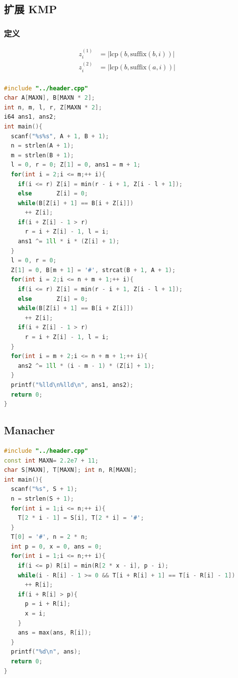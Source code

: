 \documentclass[10pt]{ctexart}
\begin{document}
\begin{multicols}{3}
    \subsection{扩展 KMP}\label{ux6269ux5c55-kmp}

    \subsubsection{定义}\label{ux5b9aux4e49}

    \[
    \begin{aligned}
    z^{(1)}_i &= |\mathrm{lcp}(b, \mathrm{suffix}(b, i))| \\
    z^{(2)}_i &= |\mathrm{lcp}(b, \mathrm{suffix}(a, i))| \\
    \end{aligned}
    \]

\begin{lstlisting}[language={C++}]
#include "../header.cpp"
char A[MAXN], B[MAXN * 2];
int n, m, l, r, Z[MAXN * 2];
i64 ans1, ans2;
int main(){
  scanf("%s%s", A + 1, B + 1);
  n = strlen(A + 1);
  m = strlen(B + 1);
  l = 0, r = 0; Z[1] = 0, ans1 = m + 1;
  for(int i = 2;i <= m;++ i){
    if(i <= r) Z[i] = min(r - i + 1, Z[i - l + 1]);
    else       Z[i] = 0;
    while(B[Z[i] + 1] == B[i + Z[i]])
      ++ Z[i];
    if(i + Z[i] - 1 > r)
      r = i + Z[i] - 1, l = i;
    ans1 ^= 1ll * i * (Z[i] + 1);
  }
  l = 0, r = 0;
  Z[1] = 0, B[m + 1] = '#', strcat(B + 1, A + 1);
  for(int i = 2;i <= n + m + 1;++ i){
    if(i <= r) Z[i] = min(r - i + 1, Z[i - l + 1]);
    else       Z[i] = 0;
    while(B[Z[i] + 1] == B[i + Z[i]])
      ++ Z[i];
    if(i + Z[i] - 1 > r)
      r = i + Z[i] - 1, l = i;
  }
  for(int i = m + 2;i <= n + m + 1;++ i){
    ans2 ^= 1ll * (i - m - 1) * (Z[i] + 1);
  }
  printf("%lld\n%lld\n", ans1, ans2);
  return 0;
}
\end{lstlisting}

    \subsection{Manacher}\label{manacher}

\begin{lstlisting}[language={C++}]
#include "../header.cpp"
const int MAXN= 2.2e7 + 11;
char S[MAXN], T[MAXN]; int n, R[MAXN];
int main(){
  scanf("%s", S + 1);
  n = strlen(S + 1);
  for(int i = 1;i <= n;++ i){
    T[2 * i - 1] = S[i], T[2 * i] = '#';
  }
  T[0] = '#', n = 2 * n;
  int p = 0, x = 0, ans = 0;
  for(int i = 1;i <= n;++ i){
    if(i <= p) R[i] = min(R[2 * x - i], p - i);
    while(i - R[i] - 1 >= 0 && T[i + R[i] + 1] == T[i - R[i] - 1])
      ++ R[i];
    if(i + R[i] > p){
      p = i + R[i];
      x = i;
    }
    ans = max(ans, R[i]);
  }
  printf("%d\n", ans);
  return 0;
}
\end{lstlisting}


\end{multicols}
\end{document}
